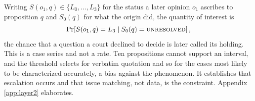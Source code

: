Writing $S(o_1,q)\in\{L_0,\dots,L_3\}$ for the status a later opinion $o_1$
ascribes to proposition $q$ and $S_0(q)$ for what the origin did, the quantity of
interest is
\begin{equation}
\Pr\!\left[S(o_1,q)=L_3 \mid S_0(q)=\textsc{unresolved}\right],
\end{equation}
the chance that a question a court declined to decide is later called its
holding. This is a case series and not a rate. Ten propositions cannot support an
interval, and the threshold selects for verbatim quotation and so for the cases
most likely to be characterized accurately, a bias against the phenomenon. It
establishes that escalation occurs and that issue matching, not data, is the
constraint. Appendix \ref{app:layer2} elaborates.


